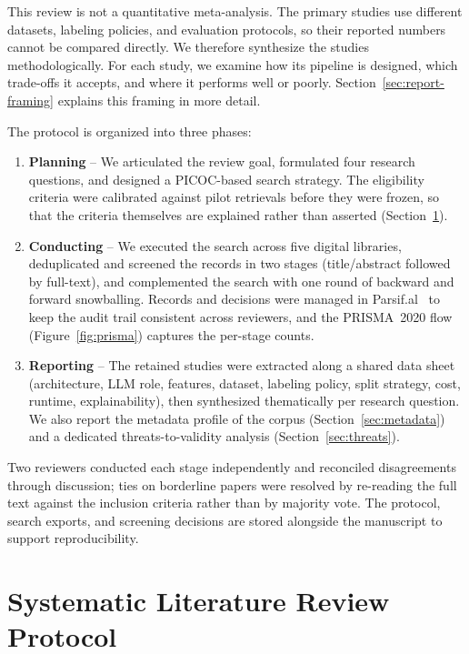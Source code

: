 This review is not a quantitative meta-analysis. The primary studies use different datasets, labeling policies, and evaluation protocols, so their reported numbers cannot be compared directly. We therefore synthesize the studies methodologically. For each study, we examine how its pipeline is designed, which trade-offs it accepts, and where it performs well or poorly. Section~\ref{sec:report-framing} explains this framing in more detail.

The protocol is organized into three phases:

\begin{enumerate}
    \item \textbf{Planning} -- We articulated the review goal, formulated four research questions, and designed a PICOC-based search strategy. The eligibility criteria were calibrated against pilot retrievals before they were frozen, so that the criteria themselves are explained rather than asserted (Section~\ref{sec:design}).

    \item \textbf{Conducting} -- We executed the search across five digital libraries, deduplicated and screened the records in two stages (title/abstract followed by full-text), and complemented the search with one round of backward and forward snowballing. Records and decisions were managed in Parsif.al~\cite{parsifal} to keep the audit trail consistent across reviewers, and the PRISMA~2020 flow (Figure~\ref{fig:prisma}) captures the per-stage counts.

    \item \textbf{Reporting} -- The retained studies were extracted along a shared data sheet (architecture, LLM role, features, dataset, labeling policy, split strategy, cost, runtime, explainability), then synthesized thematically per research question. We also report the metadata profile of the corpus (Section~\ref{sec:metadata}) and a dedicated threats-to-validity analysis (Section~\ref{sec:threats}).
\end{enumerate}

Two reviewers conducted each stage independently and reconciled disagreements through discussion; ties on borderline papers were resolved by re-reading the full text against the inclusion criteria rather than by majority vote. The protocol, search exports, and screening decisions are stored alongside the manuscript to support reproducibility.

\section{Systematic Literature Review Protocol}\label{sec:design}

